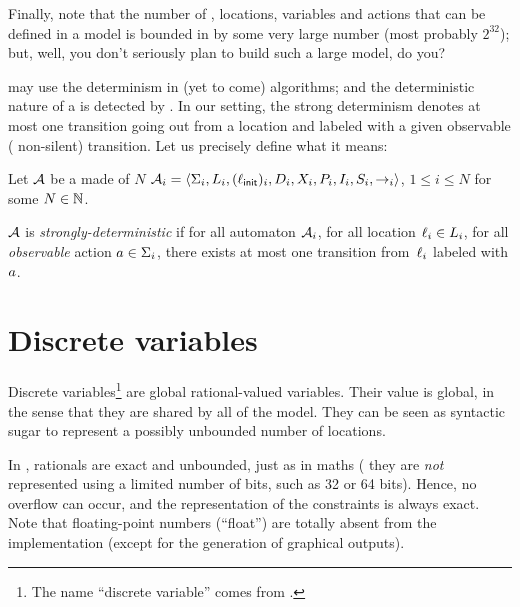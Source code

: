 
Finally, note that the number of \IPTA{}, locations, variables and actions that can be defined in a model is bounded in \imitator{} by some very large number (most probably $2^{32}$); but, well, you don't seriously plan to build such a large model, do you?

\bigskip

\imitator{} may use the determinism in (yet to come) algorithms; and the deterministic nature of a \NIPTA{} is detected by \imitator{}.
In our setting, the strong determinism denotes at most one transition going out from a location and labeled with a given observable (\ie{} non-silent) transition.
Let us precisely define what it means:

\begin{definition}
	Let $\mathcal{A}$ be a \NIPTA{} made of $N$ \IPTA{} $\mathcal{A}_i = \langle\Sigma_i, L_i, (\ell_{\textsf{init}})_i, D_i, X_i, P_i, I_i, S_i, {\rightarrow}_i\rangle$, $1 \leq i \leq N$ for some $N \in {\mathbb N}$.

	$\mathcal{A}$ is \emph{strongly-deterministic} if
	for all automaton $\mathcal{A}_i$,
	for all location $\ell_i \in L_i$,
	for all \emph{observable} action $a \in \Sigma_i$,
	there exists at most one transition from~$\ell_i$ labeled with $a$.
\end{definition}



\section{Discrete variables}\label{section:discrete}

Discrete variables\footnote{%
	The name ``discrete variable'' comes from \hytech{}.
}
are global rational-valued variables.
Their value is global, in the sense that they are shared by all \IPTA{} of the model.
They can be seen as syntactic sugar to represent a possibly unbounded number of locations.

In \imitator{}, rationals are exact and unbounded, just as in maths (\ie{} they are \emph{not} represented using a limited number of bits, such as 32 or 64 bits).
Hence, no overflow can occur, and the representation of the constraints is always exact.
Note that floating-point numbers (``float'') are totally absent from the \imitator{} implementation (except for the generation of graphical outputs).

